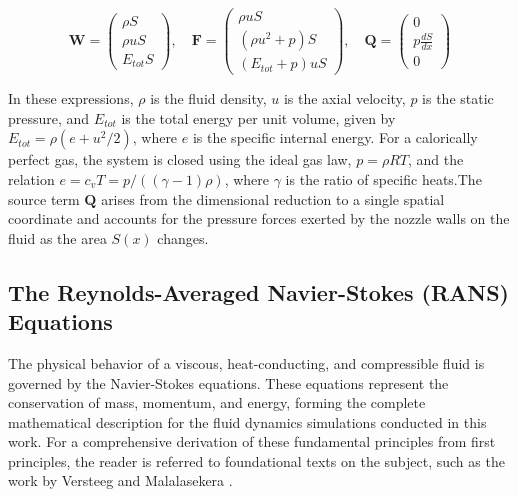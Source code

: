 \documentclass[tg, EN]{ufabcFHZh_tg}
\begin{document}
\begin{equation}
    \mathbf{W} = 
    \begin{pmatrix}
        \rho S \\
        \rho u S \\
        E_{tot}S
    \end{pmatrix},
    \quad
    \mathbf{F} = 
    \begin{pmatrix}
        \rho u S \\
        (\rho u^2 + p)S \\
        (E_{tot} + p)uS
    \end{pmatrix},
    \quad
    \mathbf{Q} = 
    \begin{pmatrix}
        0 \\
        p \frac{dS}{dx} \\
        0
    \end{pmatrix}
\end{equation}

In these expressions, $\rho$ is the fluid density, $u$ is the axial velocity, $p$ is the static pressure, and $E_{tot}$ is the total energy per unit volume, given by $E_{tot} = \rho(e + u^2/2)$, where $e$ is the specific internal energy. For a calorically perfect gas, the system is closed using the ideal gas law, $p = \rho R T$, and the relation $e = c_v T = p/((\gamma-1)\rho)$, where $\gamma$ is the ratio of specific heats.The source term $\mathbf{Q}$ arises from the dimensional reduction to a single spatial coordinate and accounts for the pressure forces exerted by the nozzle walls on the fluid as the area $S(x)$ changes. 




\subsection{The Reynolds-Averaged Navier-Stokes (RANS) Equations}
\label{sec:rans_equations}

The physical behavior of a viscous, heat-conducting, and compressible fluid is governed by the Navier-Stokes equations. These equations represent the conservation of mass, momentum, and energy, forming the complete mathematical description for the fluid dynamics simulations conducted in this work. For a comprehensive derivation of these fundamental principles from first principles, the reader is referred to foundational texts on the subject, such as the work by Versteeg and Malalasekera \citep{versteeg2007}.
\end{document}
